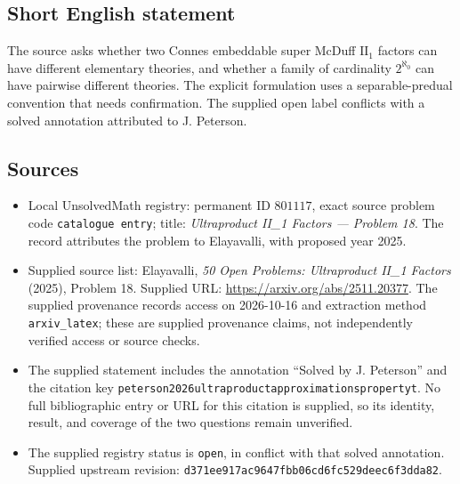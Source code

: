 \documentclass[11pt]{article}
\begin{document}
\subsection{Short English statement}
The source asks whether two Connes embeddable super McDuff \(\mathrm{II}_1\) factors can have different elementary theories, and whether a family of cardinality \(2^{\aleph_0}\) can have pairwise different theories. The explicit formulation uses a separable-predual convention that needs confirmation. The supplied open label conflicts with a solved annotation attributed to J. Peterson.
\subsection{Sources}
\begin{itemize}
\item Local UnsolvedMath registry: permanent ID \(801117\), exact source problem code \texttt{catalogue entry}; title: \emph{Ultraproduct II\_1 Factors --- Problem 18}. The record attributes the problem to Elayavalli, with proposed year 2025.
\item Supplied source list: Elayavalli, \emph{50 Open Problems: Ultraproduct II\_1 Factors} (2025), Problem 18. Supplied URL: \url{https://arxiv.org/abs/2511.20377}. The supplied provenance records access on 2026-10-16 and extraction method \texttt{arxiv\_latex}; these are supplied provenance claims, not independently verified access or source checks.
\item The supplied statement includes the annotation ``Solved by J. Peterson'' and the citation key \texttt{peterson2026ultraproductapproximationspropertyt}. No full bibliographic entry or URL for this citation is supplied, so its identity, result, and coverage of the two questions remain unverified.
\item The supplied registry status is \texttt{open}, in conflict with that solved annotation. Supplied upstream revision: \texttt{d371ee917ac9647fbb06cd6fc529deec6f3dda82}.
\end{itemize}
\end{document}
